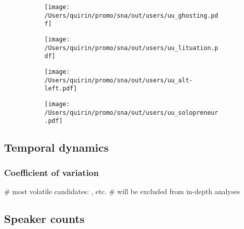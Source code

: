 \documentclass[
  a4paper,
  ]{scrartcl}
\begin{document}
    \begin{figure}[H]
      \caption{Cumulative counts for unique speakers that have used the target neologisms.}
      \centering
      \begin{subfigure}{.45\linewidth}
        \caption{}
        \centering
        \texttt{[image: /Users/quirin/promo/sna/out/users/uu\_ghosting.pdf]}
      \end{subfigure}
      \begin{subfigure}{.45\linewidth}
        \caption{}
        \centering
        \texttt{[image: /Users/quirin/promo/sna/out/users/uu\_lituation.pdf]}
      \end{subfigure}

      \begin{subfigure}{.45\linewidth}
        \caption{}
        \centering
        \texttt{[image: /Users/quirin/promo/sna/out/users/uu\_alt-left.pdf]}
      \end{subfigure}
      \begin{subfigure}{.45\linewidth}
        \caption{}
        \centering
        \texttt{[image: /Users/quirin/promo/sna/out/users/uu\_solopreneur.pdf]}
      \end{subfigure}
    \end{figure}

  \subsection{Temporal dynamics}

    \subsubsection{Coefficient of variation}

      \begin{easylist}[itemize]
        # most volatile candidates: ,  etc.
        # will be excluded from in-depth analyses
      \end{easylist}

  \subsection{Speaker counts}
\end{document}
